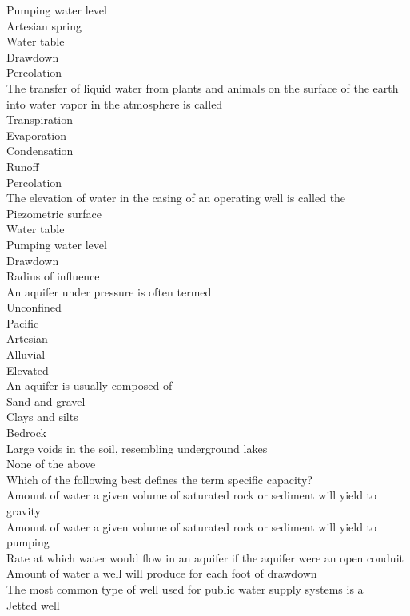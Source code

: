 Pumping water level\\
Artesian spring\\
Water table\\
Drawdown\\
Percolation\\
The transfer of liquid water from plants and animals on the surface of the earth into water vapor in the atmosphere is called\\
Transpiration\\
Evaporation\\
Condensation\\
Runoff\\
Percolation\\
The elevation of water in the casing of an operating well is called the\\
Piezometric surface\\
Water table\\
Pumping water level\\
Drawdown\\
Radius of influence\\
An aquifer under pressure is often termed\\
Unconfined\\
Pacific\\
Artesian\\
Alluvial\\
Elevated\\
An aquifer is usually composed of\\
Sand and gravel \\
Clays and silts\\
Bedrock\\
Large voids in the soil, resembling underground lakes\\
None of the above\\
Which of the following best defines the term specific capacity?\\
Amount of water a given volume of saturated rock or sediment will yield to gravity\\
Amount of water a given volume of saturated rock or sediment will yield to pumping\\
Rate at which water would flow in an aquifer if the aquifer were an open conduit\\
Amount of water a well will produce for each foot of drawdown\\
The most common type of well used for public water supply systems is a\\
Jetted well\\
